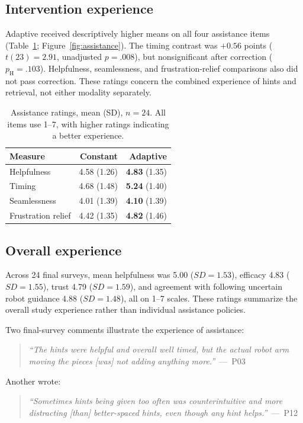 \documentclass[sigconf,anonymous]{aamas}
\begin{document}
\subsection{Intervention experience}
Adaptive received descriptively higher means on all four assistance items (Table~\ref{tab:assistance}; Figure~\ref{fig:assistance}). The timing contrast was $+0.56$ points ($t(23)=2.91$, unadjusted $p=.008$), but nonsignificant after correction ($p_{\mathrm{H}}=.103$). Helpfulness, seamlessness, and frustration-relief comparisons also did not pass correction. These ratings concern the combined experience of hints and retrieval, not either modality separately.

\begin{table}[h]
\centering
\caption{Assistance ratings, mean (SD), $n=24$. All items use 1--7, with higher ratings indicating a better experience.}
\label{tab:assistance}
\begin{tabular}{lrr}
\toprule
Measure & Constant & Adaptive \\
\midrule
Helpfulness & 4.58 (1.26) & \textbf{4.83} (1.35) \\
Timing & 4.68 (1.48) & \textbf{5.24} (1.40) \\
Seamlessness & 4.01 (1.39) & \textbf{4.10} (1.39) \\
Frustration relief & 4.42 (1.35) & \textbf{4.82} (1.46) \\
\bottomrule
\end{tabular}
\end{table}



\subsection{Overall experience}
Across 24 final surveys, mean helpfulness was 5.00 ($SD=1.53$), efficacy 4.83 ($SD=1.55$), trust 4.79 ($SD=1.59$), and agreement with following uncertain robot guidance 4.88 ($SD=1.48$), all on 1--7 scales. These ratings summarize the overall study experience rather than individual assistance policies.

Two final-survey comments illustrate the experience of assistance:

\begin{quote}
\textit{``The hints were helpful and overall well timed, but the actual robot arm moving the pieces [was] not adding anything more.''}~---~P03
\end{quote}

Another wrote:
\begin{quote}
\textit{``Sometimes hints being given too often was counterintuitive and more distracting [than] better-spaced hints, even though any hint helps.''}~---~P12
\end{quote}
\end{document}
